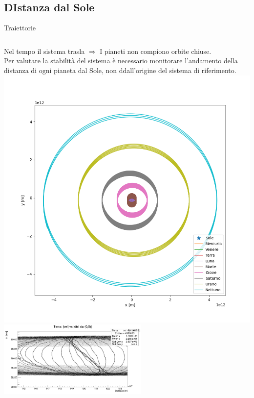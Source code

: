 \subsection[Dist Sole]{DIstanza dal Sole}
        \begin{frame}{Traiettorie}
            \begin{columns}
                    Nel tempo il sistema trasla $\Rightarrow$ I pianeti non compiono orbite chiuse.\\
                    Per valutare la stabilità del sistema è necessario monitorare l'andamento della distanza di ogni pianeta dal Sole, non ddall'origine del sistema di riferimento.
                    \includegraphics[width=.9\textwidth]{5_distanza/sistema_orbite.png}
                    \label{cfr::orb} 
                    \centering
                    \includegraphics[width=.9\textwidth, height=3.75cm]{5_distanza/ter_vd_errato.jpg}

\end{columns}
\end{frame}

